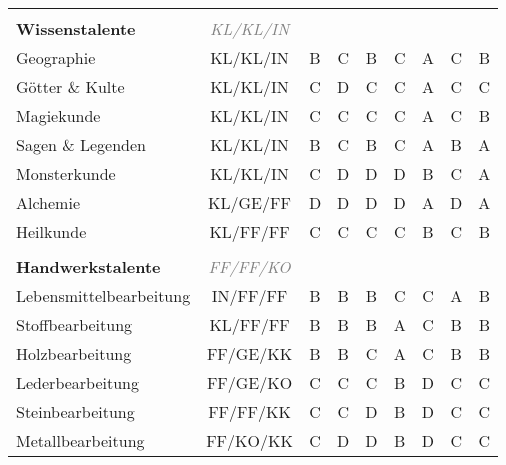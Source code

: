 \begin{center}
\begin{longtable}{|l|c|c|c|c|c|c|c|c|}
\hline
\multicolumn{9}{|l|}{} \\
\multicolumn{1}{|l}{\textbf{Wissenstalente}} & \multicolumn{1}{c}{\textcolor{gray}{\textit{KL/KL/IN}}} & \multicolumn{7}{r|}{} \\
\hline
Geographie & KL/KL/IN & B & C & B & C & A & C & B \\
\hline
Götter \& Kulte & KL/KL/IN & C & D & C & C & A & C & C \\
\hline
Magiekunde\footnotemark[1] & KL/KL/IN & C & C & C & C & A & C & B \\
\hline
Sagen \& Legenden & KL/KL/IN & B & C & B & C & A & B & A \\
\hline
Monsterkunde & KL/KL/IN & C & D & D & D & B & C & A \\
\hline
Alchemie & KL/GE/FF & D & D & D & D & A & D & A \\
\hline
Heilkunde & KL/FF/FF & C & C & C & C & B & C & B \\
 

\hline
\multicolumn{9}{|l|}{} \\
\multicolumn{1}{|l}{\textbf{Handwerkstalente}} & \multicolumn{1}{c}{\textcolor{gray}{\textit{FF/FF/KO}}} & \multicolumn{7}{r|}{} \\
\hline
Lebensmittelbearbeitung & IN/FF/FF & B & B & B & C & C & A & B \\
\hline
Stoffbearbeitung & KL/FF/FF & B & B & B & A & C & B & B \\
\hline
Holzbearbeitung & FF/GE/KK & B & B & C & A & C & B & B \\
\hline
Lederbearbeitung\footnotemark[1] & FF/GE/KO & C & C & C & B & D & C & C \\
\hline
Steinbearbeitung\footnotemark[1] & FF/FF/KK & C & C & D & B & D & C & C \\
\hline
Metallbearbeitung\footnotemark[1] & FF/KO/KK & C & D & D & B & D & C & C \\
 


\end{longtable}
\end{center}
